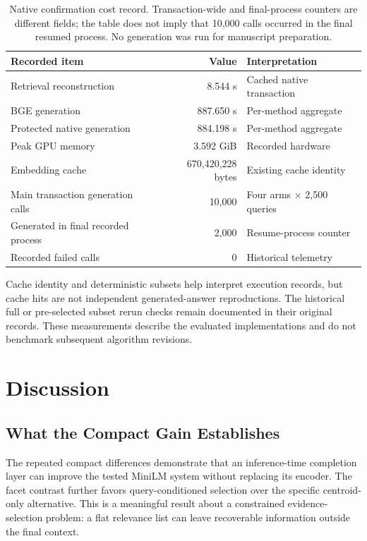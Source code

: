 \documentclass[11pt,a4paper]{article}
\begin{document}
\begin{table}[t]
\centering\small
\begin{tabular}{@{}p{}rp{}@{}}
\toprule
Recorded item & Value & Interpretation\\
\midrule
Retrieval reconstruction & 8.544 s & Cached native transaction\\
BGE generation & 887.650 s & Per-method aggregate\\
Protected native generation & 884.198 s & Per-method aggregate\\
Peak GPU memory & 3.592 GiB & Recorded hardware\\
Embedding cache & 670,420,228 bytes & Existing cache identity\\
Main transaction generation calls & 10,000 & Four arms $\times$ 2,500 queries\\
Generated in final recorded process & 2,000 & Resume-process counter\\
Recorded failed calls & 0 & Historical telemetry\\
\bottomrule
\end{tabular}
\caption{Native confirmation cost record. Transaction-wide and final-process
counters are different fields; the table does not imply that 10,000 calls
occurred in the final resumed process. No generation was run for manuscript
preparation.}
\label{tab:cost}
\end{table}

Cache identity and deterministic subsets help interpret execution records,
but cache hits are not independent generated-answer reproductions. The
historical full or pre-selected subset rerun checks remain documented in
their original records. These measurements describe the evaluated
implementations and do not benchmark subsequent algorithm revisions.

\section{Discussion}
\subsection{What the Compact Gain Establishes}
The repeated compact differences demonstrate that an inference-time
completion layer can improve the tested MiniLM system without replacing
its encoder. The facet contrast further favors query-conditioned selection
over the specific centroid-only alternative. This is a meaningful result
about a constrained evidence-selection problem: a flat relevance list can
leave recoverable information outside the final context.
\end{document}
